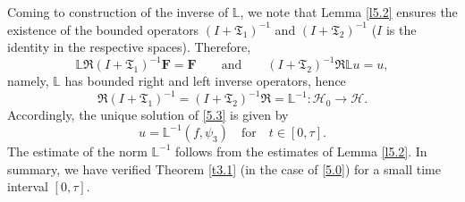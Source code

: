 \documentclass[reqno]{amsart}
\theoremstyle{definition}
\numberwithin{equation}{section}
\begin{document}
Coming to construction of the inverse of $\mathbb{L}$, we
note that Lemma \ref{l5.2} ensures the existence of the  bounded operators $(I+\mathfrak{T}_1)^{-1}$ and $(I+\mathfrak{T}_2)^{-1}$ ($I$ is the identity in the respective spaces). Therefore,
\[
\mathbb{L}\mathfrak{R}(I+\mathfrak{T}_1)^{-1}\mathbf{F}=\mathbf{F}\qquad\text{and}\qquad
(I+\mathfrak{T}_2)^{-1}\mathfrak{R}\mathbb{L}u=u,
\]
namely, $\mathbb{L}$ has bounded right and left inverse operators, hence  
\[
\mathfrak{R}(I+\mathfrak{T}_1)^{-1}=(I+\mathfrak{T}_2)^{-1}\mathfrak{R}
=\mathbb{L}^{-1}:{\mathcal H}_0\to{\mathcal H}.
\]
Accordingly, the unique solution of \eqref{5.3} is given by
\begin{equation}\label{5.7}
u=\mathbb{L}^{-1}(f,\psi_3)\quad\text{for}\quad t\in[0,\tau].
\end{equation}
The estimate of the norm $\mathbb{L}^{-1}$ follows from the estimates of Lemma \ref{l5.2}.
In summary, we have verified Theorem \ref{t3.1} (in the case of \eqref{5.0}) for a small time interval $[0,\tau]$.


\end{document}
